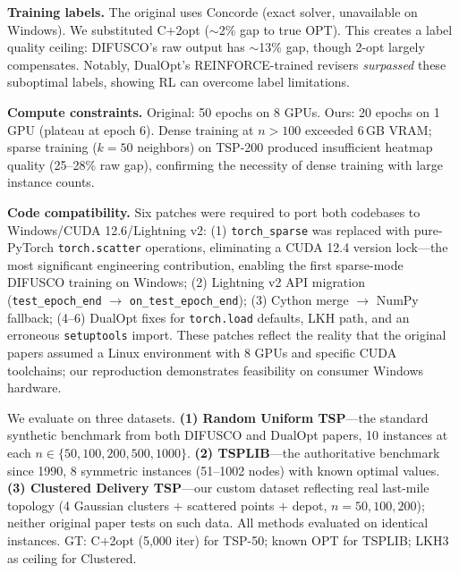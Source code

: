 \documentclass[10pt]{article}
\makeatletter
\renewcommand{\section}{\@startsection{section}{1}{\z@}{3pt plus 1pt}{1pt}{\normalsize\bfseries}}
\makeatother
\begin{document}
\textbf{Training labels.} The original uses Concorde (exact solver, unavailable on Windows). We substituted C$+$2opt ($\sim$2\% gap to true OPT). This creates a label quality ceiling: DIFUSCO's raw output has $\sim$13\% gap, though 2-opt largely compensates. Notably, DualOpt's REINFORCE-trained revisers \textit{surpassed} these suboptimal labels, showing RL can overcome label limitations.

\textbf{Compute constraints.} Original: 50 epochs on 8 GPUs. Ours: 20 epochs on 1 GPU (plateau at epoch 6). Dense training at $n>100$ exceeded 6\,GB VRAM; sparse training ($k=50$ neighbors) on TSP-200 produced insufficient heatmap quality (25--28\% raw gap), confirming the necessity of dense training with large instance counts.

\textbf{Code compatibility.} Six patches were required to port both codebases to Windows/CUDA 12.6/Lightning v2: (1) \texttt{torch\_sparse} was replaced with pure-PyTorch \texttt{torch.scatter} operations, eliminating a CUDA 12.4 version lock---the most significant engineering contribution, enabling the first sparse-mode DIFUSCO training on Windows; (2) Lightning v2 API migration (\texttt{test\_epoch\_end} $\rightarrow$ \texttt{on\_test\_epoch\_end}); (3) Cython merge $\rightarrow$ NumPy fallback; (4--6) DualOpt fixes for \texttt{torch.load} defaults, LKH path, and an erroneous \texttt{setuptools} import. These patches reflect the reality that the original papers assumed a Linux environment with 8 GPUs and specific CUDA toolchains; our reproduction demonstrates feasibility on consumer Windows hardware.

\section{Experimental Evaluation}

We evaluate on three datasets. \textbf{(1) Random Uniform TSP}---the standard synthetic benchmark from both DIFUSCO and DualOpt papers, 10 instances at each $n\in\{50,100,200,500,1000\}$. \textbf{(2) TSPLIB}---the authoritative benchmark since 1990, 8 symmetric instances (51--1002 nodes) with known optimal values. \textbf{(3) Clustered Delivery TSP}---our custom dataset reflecting real last-mile topology (4 Gaussian clusters $+$ scattered points $+$ depot, $n=50,100,200$); neither original paper tests on such data. All methods evaluated on identical instances. GT: C$+$2opt (5,000 iter) for TSP-50; known OPT for TSPLIB; LKH3 as ceiling for Clustered.
\end{document}
